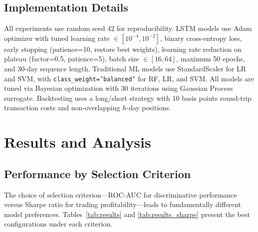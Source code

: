 \documentclass[a4paper,10pt,conference]{IEEEtran}
\begin{document}
\subsection{Implementation Details}
\label{sec:hyperopt}

All experiments use random seed 42 for reproducibility. LSTM models use Adam optimizer with tuned learning rate $\in [10^{-4}, 10^{-2}]$, binary cross-entropy loss, early stopping (patience=10, restore best weights), learning rate reduction on plateau (factor=0.5, patience=5), batch size $\in [16, 64]$, maximum 50 epochs, and 30-day sequence length. Traditional ML models use StandardScaler for LR and SVM, with \texttt{class\_weight='balanced'} for RF, LR, and SVM. All models are tuned via Bayesian optimization with 30 iterations using Gaussian Process surrogate. Backtesting uses a long/short strategy with 10 basis points round-trip transaction costs and non-overlapping $h$-day positions.


\section{Results and Analysis}

\subsection{Performance by Selection Criterion}

The choice of selection criterion---ROC-AUC for discriminative performance versus Sharpe ratio for trading profitability---leads to fundamentally different model preferences. Tables~\ref{tab:results} and \ref{tab:results_sharpe} present the best configurations under each criterion.

\begin{table}[h]
\caption{Best Model Performance by Stock (Selected by AUC)}
\label{tab:results}
\centering
{}
\end{table}
\end{document}
